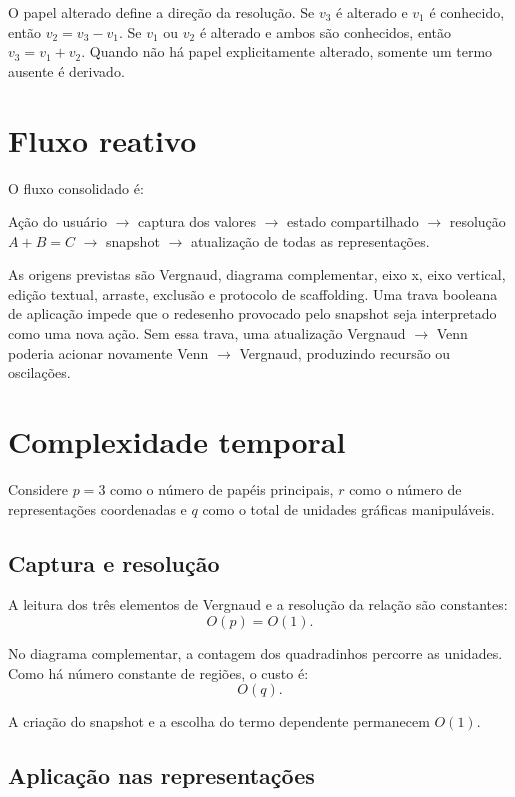 \documentclass[12pt,a4paper]{article}
\begin{document}
O papel alterado define a direção da resolução. Se $v_3$ é alterado e $v_1$ é conhecido, então $v_2=v_3-v_1$. Se $v_1$ ou $v_2$ é alterado e ambos são conhecidos, então $v_3=v_1+v_2$. Quando não há papel explicitamente alterado, somente um termo ausente é derivado.

\section{Fluxo reativo}

O fluxo consolidado é:

\begin{center}
Ação do usuário $\rightarrow$ captura dos valores $\rightarrow$ estado compartilhado $\rightarrow$ resolução $A+B=C$ $\rightarrow$ snapshot $\rightarrow$ atualização de todas as representações.
\end{center}

As origens previstas são Vergnaud, diagrama complementar, eixo x, eixo vertical, edição textual, arraste, exclusão e protocolo de scaffolding. Uma trava booleana de aplicação impede que o redesenho provocado pelo snapshot seja interpretado como uma nova ação. Sem essa trava, uma atualização Vergnaud $\rightarrow$ Venn poderia acionar novamente Venn $\rightarrow$ Vergnaud, produzindo recursão ou oscilações.

\section{Complexidade temporal}

Considere $p=3$ como o número de papéis principais, $r$ como o número de representações coordenadas e $q$ como o total de unidades gráficas manipuláveis.

\subsection{Captura e resolução}

A leitura dos três elementos de Vergnaud e a resolução da relação são constantes:
\[
O(p)=O(1).
\]

No diagrama complementar, a contagem dos quadradinhos percorre as unidades. Como há número constante de regiões, o custo é:
\[
O(q).
\]

A criação do snapshot e a escolha do termo dependente permanecem $O(1)$.

\subsection{Aplicação nas representações}
\end{document}
